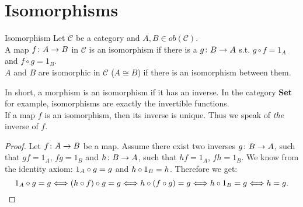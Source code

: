 \section {Isomorphisms}
\begin{definition}{Isomorphism}
  Let $\mathscr{C}$ be a category and $A, B \in ob(\mathscr{C})$. \\
  A map $f \from A \to B$ in $\mathscr{C}$ is an isomorphism if there is a $g \from B \to A$ s.t. $g \circ f = 1_A$ and $f \circ g = 1_B$. \\
  $A$ and $B$ are isomorphic in $\mathscr{C}$ ($A \cong B$) if there is an isomorphism between them.
\end{definition}

In short, a morphism is an isomorphism if it has an inverse.
In the category \textbf{Set} for example,
isomorphisms are exactly the invertible functions.\\
If a map $f$ is an isomorphism, then its inverse is unique. Thus we speak of
\emph{the} inverse of $f$.

\begin{proof}
  Let $f \from A \to B$ be a map.
  Assume there exist two inverses $g \from B \to A$, such that $gf = 1_A$, $fg = 1_B$ and \mbox{$h \from B \to A$}, such that $hf = 1_A$, $fh = 1_B$.
  We know from the identity axiom: $1_A \mathbin{\circ} g = g$ and $h \mathbin{\circ} 1_B = h$. Therefore we get:
 \[  1_A \mathbin{\circ} g = g \Longleftrightarrow (h \mathbin{\circ} f) \mathbin{\circ} g = g \Longleftrightarrow h \mathbin{\circ} (f \mathbin{\circ} g) = g \Longleftrightarrow h \mathbin{\circ} 1_B = g \Longleftrightarrow h=g. \]
\end{proof}


